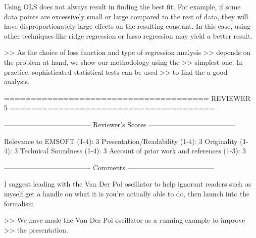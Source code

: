 Using OLS does not always result in finding the best fit. For example, if some
data points are excessively small or large compared to the rest of data, they
will have disproportionately large effects on the resulting constant. In this
case, using other techniques like ridge regression or lasso regression may
yield a better result.

>> As the choice of loss function and type of regression analysis
>> depends on the problem at hand, we show our methodology using the
>> simplest one. In practice, sophisticated statistical tests can be used
>> to find the a good analysis.


======================================
                            REVIEWER 5
======================================


--------------------------------------
Reviewer's Scores
--------------------------------------

               Relevance to EMSOFT (1-4): 3
          Presentation/Readability (1-4): 3
                       Originality (1-4): 3
               Technical Soundness (1-4): 3
Account of prior work and references (1-3): 3


--------------------------------------
Comments
--------------------------------------

I suggest leading with the Van Der Pol oscillator to help ignorant
readers such as myself get a handle on what it is you're actually able
to do, then launch into the formalism.

>> We have made the Van Der Pol oscillator as a running example to improve
>> the presentation.
